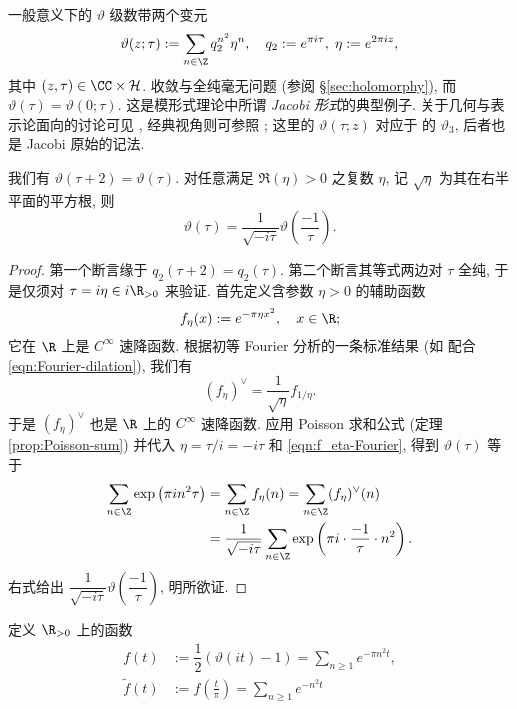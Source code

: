 \begin{remark}\label{rem:Jacobi-form} 
	一般意义下的 $\vartheta$ 级数带两个变元
	\[ \vartheta(z;\tau) := \sum_{n \in \Z} q_2^{n^2} \eta^n, \quad q_2 := e^{\pi i\tau}, \; \eta := e^{2\pi i z}, \]
	其中 $(z,\tau) \in \CC \times \mathcal{H}$. 收敛与全纯毫无问题 (参阅 \S\ref{sec:holomorphy}), 而 $\vartheta(\tau) = \vartheta(0;\tau)$. 这是模形式理论中所谓 \emph{Jacobi 形式}的典型例子. 关于几何与表示论面向的讨论可见 \cite{Mum91}, 经典视角则可参照 \cite[第九章]{GW}; 这里的 $\vartheta(\tau;z)$ 对应于 \cite{GW} 的 $\vartheta_3$, 后者也是 Jacobi 原始的记法.
\end{remark}

\begin{theorem}[函数方程]\label{prop:theta-fcneq}
	我们有 $\vartheta(\tau + 2) = \vartheta(\tau)$. 对任意满足 $\Re(\eta) > 0$ 之复数 $\eta$, 记 $\sqrt{\eta}$ 为其在右半平面的平方根, 则
	\[ \vartheta(\tau) = \dfrac{1}{\sqrt{-i\tau}} \vartheta\left( \dfrac{-1}{\tau} \right). \]
\end{theorem}
\begin{proof}
	第一个断言缘于 $q_2(\tau + 2) = q_2(\tau)$. 第二个断言其等式两边对 $\tau$ 全纯, 于是仅须对 $\tau = i\eta \in i\R_{>0}$ 来验证. 首先定义含参数 $\eta > 0$ 的辅助函数
	\[ f_\eta(x) := e^{-\pi\eta x^2}, \quad x \in \R; \]
	它在 $\R$ 上是 $C^\infty$ 速降函数. 根据初等 Fourier 分析的一条标准结果 (如 \cite[Example 2.2.9]{Gra14} 配合 \eqref{eqn:Fourier-dilation}), 我们有
	\begin{equation}\label{eqn:f_eta-Fourier}
		(f_\eta)^\vee = \dfrac{1}{\sqrt{\eta}} f_{1/\eta}.
	\end{equation}
	于是 $(f_\eta)^\vee$ 也是 $\R$ 上的 $C^\infty$ 速降函数. 应用 Poisson 求和公式 (定理 \ref{prop:Poisson-sum}) 并代入 $\eta = \tau/i = -i\tau$ 和 \eqref{eqn:f_eta-Fourier}, 得到 $\vartheta(\tau)$ 等于
	\begin{align*}
		\sum_{n \in \Z} \exp\left(\pi i n^2 \tau \right) & = \sum_{n \in \Z} f_\eta(n) = \sum_{n \in \Z} (f_\eta)^\vee(n) \\
		& = \dfrac{1}{\sqrt{-i\tau}} \sum_{n \in \Z} \exp\left( \pi i \cdot \dfrac{-1}{\tau} \cdot n^2 \right).
	\end{align*}
	右式给出 $\dfrac{1}{\sqrt{-i\tau}} \vartheta\left(\dfrac{-1}{\tau}\right)$, 明所欲证.
\end{proof}

定义 $\R_{> 0}$ 上的函数
\begin{equation}\label{eqn:f-theta}\begin{aligned}
	f(t)  & := \dfrac{1}{2} \left(\vartheta(it)-1 \right) = \sum_{n \geq 1} e^{-\pi n^2 t}, \\
	\tilde{f}(t) & := f\left(\frac{t}{\pi}\right) = \sum_{n \geq 1} e^{-n^2 t}
\end{aligned}\end{equation}

